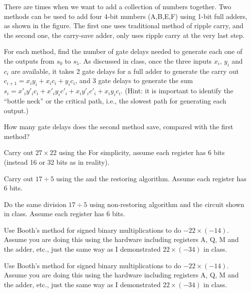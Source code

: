 \begin{enumerate}
\end{enumerate}




\item There are times when we want to add a collection of numbers together.
	Two methods can be used to add four 4-bit numbers (A,B,E,F) using 
	1-bit full adders, as shown in the figure. The first one uses
	traditional method of ripple carry, and the second one, the 
	carry-save adder, only uses ripple carry at the very last step.


	For each method, find the number of gate delays needed to generate 
	each one of the outputs from $s_0$ to $s_5$. As discussed in class, 
	once the three inputs $x_i$, $y_i$ and $c_i$ are available, it 
	takes 2 gate delays for a full adder to generate the carry out 
	$c_{i+1}=x_iy_i+x_ic_i+y_ic_i$, and 3 gate delays to generate the 
	sum $s_i=x'_iy'_ic_i+x'_iy_ic'_i+x_iy'_ic'_i+x_iy_ic_i$. (Hint: it 
	is important to identify the ``bottle neck'' or the critical path, 
	i.e., the slowest path for generating each output.)

	How many gate delays does the second method save, compared with the
	first method?

\item Carry out $27 \times 22$ using the 
        For simplicity, assume each register has 6 bits (instead 16 or 32 bits as in 
        reality).
\item Carry out $17 \div 5$ using the 
	and the restoring algorithm. Assume each register has 6 bits.

\item Do the same division $17 \div 5$ using non-restoring algorithm and the
	circuit shown in class. Assume each register has 6 bits.

\item Use Booth's method for signed binary multiplications to do $-22 \times (-14)$. 
        Assume you are doing this using the hardware including registers A, Q,
        M and the adder, etc., just the same way as I demonstrated 
        $22 \times (-34)$ in class.

\item Use Booth's method for signed binary multiplications to do $-22 \times (-14)$. 
        Assume you are doing this using the hardware including registers A, Q,
        M and the adder, etc., just the same way as I demonstrated 
        $22 \times (-34)$ in class.

